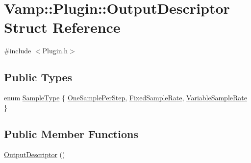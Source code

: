 \hypertarget{struct_vamp_1_1_plugin_1_1_output_descriptor}{}\section{Vamp\+:\+:Plugin\+:\+:Output\+Descriptor Struct Reference}
\label{struct_vamp_1_1_plugin_1_1_output_descriptor}


{\ttfamily \#include $<$Plugin.\+h$>$}

\subsection*{Public Types}
\begin{DoxyCompactItemize}
\item 
enum \hyperlink{struct_vamp_1_1_plugin_1_1_output_descriptor_abffa9ed50cd756df70fd51f0355f448c}{Sample\+Type} \{ \hyperlink{struct_vamp_1_1_plugin_1_1_output_descriptor_abffa9ed50cd756df70fd51f0355f448ca0459d5d0d2198d21e8bc90abe4fdccca}{One\+Sample\+Per\+Step}, 
\hyperlink{struct_vamp_1_1_plugin_1_1_output_descriptor_abffa9ed50cd756df70fd51f0355f448ca4c74bd2fc96dfe2815623f94b40e5629}{Fixed\+Sample\+Rate}, 
\hyperlink{struct_vamp_1_1_plugin_1_1_output_descriptor_abffa9ed50cd756df70fd51f0355f448cadea995a737867f7b22b52f1c43c5432e}{Variable\+Sample\+Rate}
 \}
\end{DoxyCompactItemize}
\subsection*{Public Member Functions}
\begin{DoxyCompactItemize}
\item 
\hyperlink{struct_vamp_1_1_plugin_1_1_output_descriptor_a1ebf91cc3f60e4cbba818c10591cd344}{Output\+Descriptor} ()
\end{DoxyCompactItemize}
